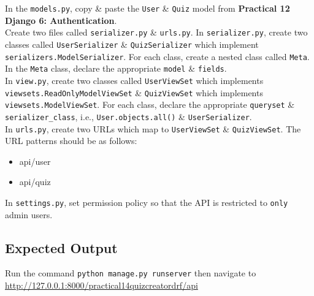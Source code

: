 \documentclass{article}
\begin{document}
In the \texttt{models.py}, copy \& paste the \texttt{User} \& \texttt{Quiz} model from \textbf{Practical 12 Django 6: Authentication}. \\

Create two files called \texttt{serializer.py} \& \texttt{urls.py}. In \texttt{serializer.py}, create two classes called \texttt{UserSerializer} \& \texttt{QuizSerializer} which implement \texttt{serializers.ModelSerializer}. For each class, create a nested class called \texttt{Meta}. In the \texttt{Meta} class, declare the appropriate \texttt{model} \& \texttt{fields}. \\

In \texttt{view.py}, create two classes called \texttt{UserViewSet} which implements \texttt{viewsets.ReadOnlyModelViewSet} \& \texttt{QuizViewSet} which implements \texttt{viewsets.ModelViewSet}. For each class, declare the appropriate \texttt{queryset} \& \texttt{serializer\_class}, i.e., \texttt{User.objects.all()} \& \texttt{UserSerializer}. \\

In \texttt{urls.py}, create two URLs which map to \texttt{UserViewSet} \& \texttt{QuizViewSet}. The URL patterns should be as follows:
\begin{itemize}
  \item api/user
  \item api/quiz
\end{itemize} 

In \texttt{settings.py}, set permission policy so that the API is restricted to \texttt{only} admin users.

\subsection*{Expected Output} 
Run the command \texttt{python manage.py runserver} then navigate to \href{http://127.0.0.1:8000/practical14quizcreatordrf/api}{http://127.0.0.1:8000/practical14quizcreatordrf/api} \\
\end{document}

